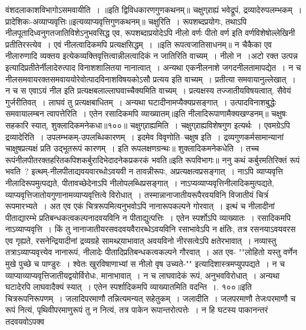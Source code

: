 वंशदलाकाशविभागोऽसमवायीति~।
॥इति द्विविधकारणगुणकथनम्॥
चक्षुग्र्राह्यं भवेद्रूपं, द्रव्यादेरुपलम्भकम्~।
प्रादेशिकः-अव्याप्यवृत्तिः॥इत्यव्याप्यवृत्तिगुणकथनम्॥
चक्षुरिति~। रूपशब्दप्रयोगः, तथाऽपि नीलपूतादिध्वनुगतजातिविशेऽनुभवसिद्ध एव, रूपशब्दाप्रयोदेऽपि नीलो वर्णः पीतो वर्ण इति वर्णविशेषोल्लेखिनी प्रतीतिरस्त्येव~।
एवं नीलत्वादिकमपि प्रत्यक्षसिद्धम्~।
॥इति रूपत्वजातिसाधनम्॥
न चैकैका एव नीलारुणादि व्यक्तय इत्येकव्यक्तिवृत्तित्वान्नीलत्वादिकं न जातिरिति वाच्यम्~। नीलो न~।अटो रक्त उत्पन्न इत्यादिप्रतीतेर्नीलादेरुत्पाद
विनाशशालितया नानात्वात्~। अन्यथा एकनीलनाशे जगदनीलतामापद्येत~। न च नीलसमवायरक्तसमवाययोरेवोत्पादविनाशविषयकोऽसौ प्रत्यय इति वाच्यम्~। प्रतीत्या
समवायानुल्लेखात्~। न च स एवाऽयं नील इति प्रत्यक्षबलाल्लाघवाच्चैक्यमिति वाच्यम्~। प्रत्यक्षस्य तज्जातीयविषयत्वात्. सैवेयं गुर्जरीतिवत्~। लाघवं तु प्रत्यक्षबाधितम्~।
अन्यथा घटादीनामप्यैक्यप्रसङ्गात्~। उत्पादविनाशबुद्धेः समवायालम्बन त्वापत्तेरिति~। एतेन रसादिकमपि व्याख्यातम्॥इति नीलादिरूपाणामैक्यखण्डनम्॥
चक्षुषः सहकारि स्यात्, शुक्लादिकमनेकधा॥१००॥
चक्षुग्र्राह्यमिति~। चक्षुग्र्राह्यविशेषगुण इत्यर्थः~। एवमग्रेऽपि
द्रव्यादेरिति~। उपलम्भकम्-उपलब्धिकारणम्~। इदमेव विवृणोति--चक्षुष इति~। द्रव्यगुणकर्मसामान्यानां चाक्षुषप्रत्यक्षं प्रति उद्भूतरूपं कारणम्~। इति रूपलक्षणग्रन्थः॥
शुक्लादिकमनेकधेति~। तच्च रूपंनीलपीतरक्तहरितकपिशकर्बुरादिभेदादनेकप्रकरकं भवति॥इति रूपविभागः॥
ननु कथं कर्बुरमतिरिक्तं रूपं भवति~? इत्थम्-नीलपीताद्यवयवारब्धोऽवयवी न तावन्नीरूपः, अप्रत्यक्षत्वप्रसङ्गात्~। नाऽपि व्याप्यवृत्ति नीलादिरूपमुत्पद्यते,
पीतावच्छेदेनाऽपि नीलोपलब्धिप्रसङ्गात्~। नाऽप्यव्याप्यवृत्तिनीलादिकमुत्पद्यते, व्याप्यवृत्तिजातोयगुणानामव्याप्यवृत्तित्वे विरोधात्~। तस्मान्नानाजातीयरूपैरवयविनि विजातीयं
चित्रंं रूपमारभ्यते~। अत एव एकं चित्ररूपमित्यनुभवोऽपि नानारूपकल्पने गोरवात्~।
इत्थं च नीलादीनां पीताद्यारम्भे प्रतिबन्धकत्वकल्पनादवयविनि न पीताद्युत्पत्तिः~।
एतेन स्पर्शोऽपि व्याख्यातः~।
रसादिकमपि नाऽव्याप्यवृत्ति~। किं तु नानाजातीयरसवदवयवैरारब्धेऽवयविनि रसाभावेऽपि न क्षंतिः, तत्र रसनयाऽवयवरस एव गृह्यते, रसनेन्द्रियादीनां द्रव्यग्रहे
सामथ्र्र्याभावात् अवयविनो नीरसत्वेऽपि क्षतेरभावात्~।
नव्यास्तु तत्राऽव्याप्यवृत्त्येव नानारूपं, नीलादेः पीतादिप्रतिबन्धकत्वकल्पने गौरवात्~। अत एव-
""लोहितो यस्तु वर्णेन मुखे पुच्छे च पाण्डुरः~।
श्वेतः खुरविषाणाभ्यां स नीलो वृष उच्यते-""
इत्यादिशास्त्रमप्युपपद्यते~। न च व्याप्याव्याप्यवृत्तिजातीयद्वयोर्विरोधः, मानाभावात्~। न च लाघवादेकं रूपं, अनुभवविरोधात्~। अन्यथा घटादेरपि लाघवादैक्यं स्यात्~।
एतेन स्पर्शादिकमपि व्याख्यातमिति वदन्ति~।. १००॥इति चित्ररूपनिरूपणम्~।
जलादिपरमाणौ तन्नित्यमन्यत् सहेतुकम्~।
जलादीति~। जलपरमाणौ तेजःपरमाणौ च रूपं नित्यं, पृथिवीपरमाणुरूपं तु न नित्यं, तत्र पाकेन रूपान्तरोत्पत्तेः~। न हि घटस्य पाकानन्तरं तदवयवोऽपक्व
